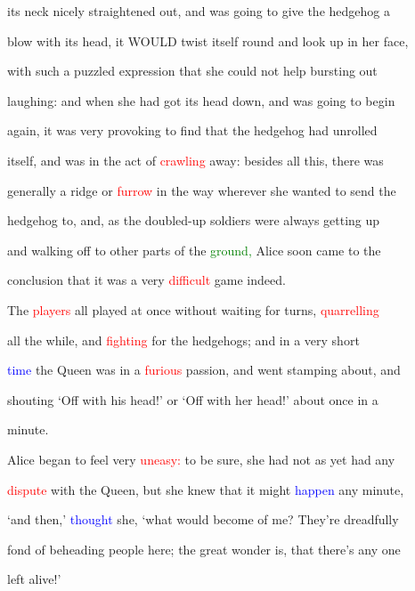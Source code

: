 its neck nicely straightened out, and was going to give the hedgehog a

 blow with its head, it WOULD twist itself round and look up in her face,

 with such a puzzled expression that she could not help bursting out

 \textcolor{BurntOrange}{laughing:} and when she had got its head down, and was going to begin

 again, it was very provoking to find that the hedgehog had unrolled

 itself, and was in the act of \textcolor{red}{crawling} away: besides all this, there was

 generally a ridge or \textcolor{red}{furrow} in the way wherever she wanted to send the

 hedgehog to, and, as the doubled-up \textcolor{BurntOrange}{soldiers} were always getting up

 and walking off to other parts of the \textcolor{green}{ground,} Alice soon came to the

 conclusion that it was a very \textcolor{red}{difficult} game indeed.



 The \textcolor{red}{players} all played at once without \textcolor{BurntOrange}{waiting} for turns, \textcolor{red}{quarrelling}

 all the while, and \textcolor{red}{fighting} for the hedgehogs; and in a very short

 \textcolor{blue}{time} the Queen was in a \textcolor{red}{furious} \textcolor{BurntOrange}{passion,} and went stamping about, and

 \textcolor{BurntOrange}{shouting} ‘Off with his head!’ or ‘Off with her head!’ about once in a

 minute.



 Alice began to feel very \textcolor{red}{uneasy:} to be sure, she had not as yet had any

 \textcolor{red}{dispute} with the Queen, but she knew that it might \textcolor{blue}{happen} any minute,

 ‘and then,’ \textcolor{blue}{thought} she, ‘what would become of me? They’re \textcolor{BurntOrange}{dreadfully}

 fond of beheading people here; the great wonder is, that there’s any one

 left \textcolor{BurntOrange}{alive!’}



